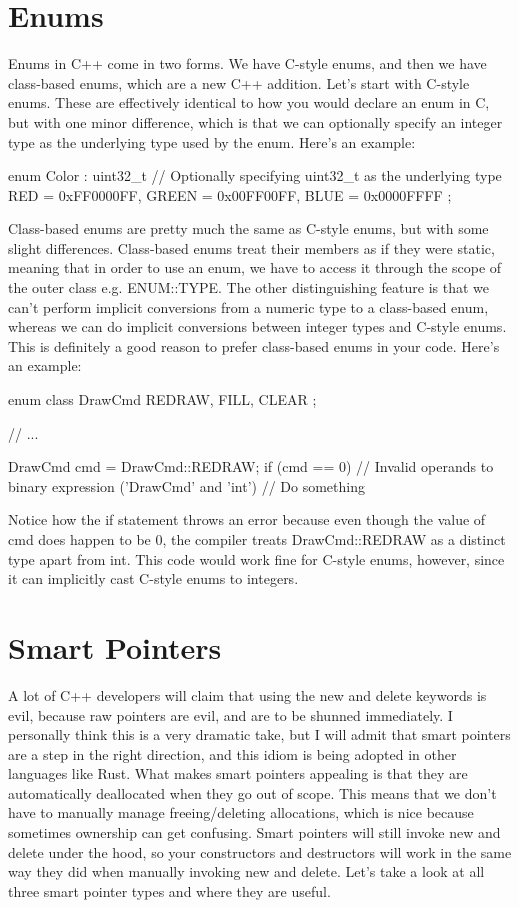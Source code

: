 \documentclass{article}
\begin{document}
\section{Enums}

Enums in C++ come in two forms. We have C-style enums, and then we have class-based enums, which are a new
C++ addition. Let's start with C-style enums. These are effectively identical to how you would declare an enum
in C, but with one minor difference, which is that we can optionally specify an integer type as the
underlying type used by the enum. Here's an example:

\begin{cpplst}
enum Color : uint32_t // Optionally specifying uint32_t as the underlying type
{
    RED     = 0xFF0000FF,
    GREEN   = 0x00FF00FF,
    BLUE    = 0x0000FFFF
};
\end{cpplst}

Class-based enums are pretty much the same as C-style enums, but with some slight differences. Class-based
enums treat their members as if they were static, meaning that in order to use an enum, we have to access it
through the scope of the outer class e.g. ENUM::TYPE. The other distinguishing feature is that we can't
perform implicit conversions from a numeric type to a class-based enum, whereas we can do implicit conversions
between integer types and C-style enums. This is definitely a good reason to prefer class-based enums in your
code. Here's an example:

\begin{cpplst}
enum class DrawCmd
{
    REDRAW,
    FILL,
    CLEAR
};

// ...

DrawCmd cmd = DrawCmd::REDRAW;
if (cmd == 0) // Invalid operands to binary expression ('DrawCmd' and 'int')
{
    // Do something
}
\end{cpplst}

Notice how the if statement throws an error because even though the value of cmd does happen to be 0, the
compiler treats DrawCmd::REDRAW as a distinct type apart from int. This code would work fine for C-style
enums, however, since it can implicitly cast C-style enums to integers.

\section{Smart Pointers}

A lot of C++ developers will claim that using the new and delete keywords is evil, because raw pointers are
evil, and are to be shunned immediately. I personally think this is a very dramatic take, but I will admit
that smart pointers are a step in the right direction, and this idiom is being adopted in other languages like
Rust. What makes smart pointers appealing is that they are automatically deallocated when they go out of
scope. This means that we don't have to manually manage freeing/deleting allocations, which is nice because
sometimes ownership can get confusing. Smart pointers will still invoke new and delete under the hood, so
your constructors and destructors will work in the same way they did when manually invoking new and delete.
Let's take a look at all three smart pointer types and where they are useful.
\end{document}
